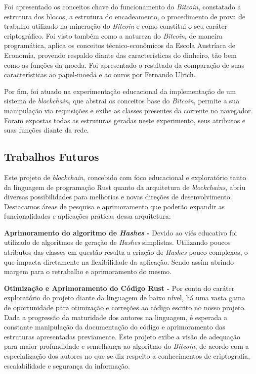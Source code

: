 \documentclass[article,12pt,oneside,a4paper,english,brazil]{unifil}
\begin{document}
\begin{Spacing}{1.5}
Foi apresentado os conceitos chave do funcionamento do \textit{Bitcoin}, constatado a estrutura dos blocos, a estrutura do encadeamento, o procedimento de prova de trabalho utilizado na mineração do \textit{Bitcoin} e como constitui o seu caráter criptográfico. Foi visto também como a natureza do \textit{Bitcoin}, de maneira programática, aplica os conceitos técnico-econômicos da Escola Austríaca de Economia, provendo respaldo diante das características do dinheiro, tão bem como as funções da moeda. Foi apresentado o resultado da comparação de suas características ao papel-moeda e ao ouros por Fernando Ulrich.

Por fim, foi atuado na experimentação educacional da implementação de um sistema de \textit{blockchain}, que abstrai os conceitos base do \textit{Bitcoin}, permite a sua manipulação via requisições e exibe as classes presentes da corrente no navegador. Foram expostas todas as estruturas geradas neste experimento, seus atributos e suas funções diante da rede.

\subsection*{Trabalhos Futuros}

Este projeto de \textit{blockchain}, concebido com foco educacional e exploratório tanto da linguagem de programação Rust quanto da arquitetura de \textit{blockchains}, abriu diversas possibilidades para melhorias e novas direções de desenvolvimento. Destacamos áreas de pesquisa e aprimoramento que poderão expandir as funcionalidades e aplicações práticas dessa arquitetura:

\textbf{Aprimoramento do algoritmo de \textit{Hashes} - }Devido ao viés educativo foi utilizado de algoritmos de geração de \textit{Hashes} simplistas. Utilizando poucos atributos das classes em questão resulta a criação de \textit{Hashes} pouco complexos, o que impacta diretamente na flexibilidade da aplicação. Sendo assim abrindo margem para o retrabalho e aprimoramento do mesmo.

\textbf{Otimização e Aprimoramento do Código Rust - }Por conta do caráter exploratório do projeto diante da linguagem de baixo nível, há uma vasta gama de oportunidade para otimização e correções ao código escrito no nosso projeto. Dada a progressão da maturidade dos autores na linguagem, é esperada a constante manipulação da documentação do código e aprimoramento das estruturas apresentadas previamente. Este projeto exibe a visão de adequação para maior profundidade e semelhança ao algoritmo do \textit{Bitcoin}, de acordo com a especialização dos autores no que se diz respeito a conhecimentos de criptografia, escalabilidade e segurança da informação.


\end{Spacing}
\end{document}
